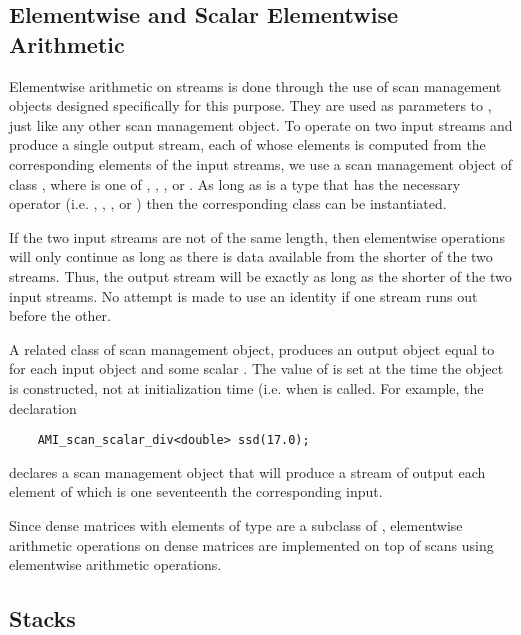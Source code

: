 \subsection{Elementwise and Scalar Elementwise Arithmetic}


Elementwise arithmetic on streams is done through the use of scan
management objects designed specifically for this purpose.  They are
used as parameters to , just like any other scan
management object.  To operate on two input streams and produce a
single output stream, each of whose elements is computed from the
corresponding elements of the input streams, we use a scan management
object of class , where  is one of
, , , or .  As long as
 is a type that has the necessary operator (i.e. \myverb{+},
\myverb{-}, \myverb{*}, or \myverb{/}) then the corresponding class
 can be instantiated.

If the two input streams are not of the same length, then elementwise
operations will only continue as long as there is data available from
the shorter of the two streams.  Thus, the output stream will be
exactly as long as the shorter of the two input streams.  No attempt
is made to use an identity if one stream runs out before the other.

A related class of scan management object,
 produces an output object equal to
 for each input object  and some scalar .
The value of  is set at the time the object is constructed,
not at initialization time (i.e. when  is called.
For example, the declaration
\begin{verbatim}
    AMI_scan_scalar_div<double> ssd(17.0);
\end{verbatim}
declares a scan management object that will produce a stream of output
each element of which is one seventeenth the corresponding input.

Since dense matrices with elements of type  are a subclass of
, elementwise arithmetic operations on dense
matrices are implemented on top of scans using elementwise arithmetic
operations.



\subsection{Stacks}

